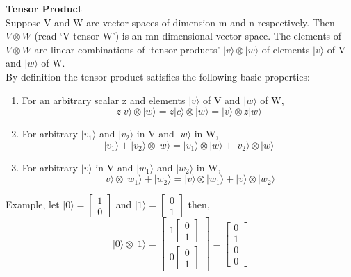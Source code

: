 \documentclass[12pt]{report}
\begin{document}
\begin{defn}
\textbf{Tensor Product}\\
Suppose V and W are vector spaces of dimension m and n respectively. Then $V \otimes W$ (read ‘V tensor W’) is an mn dimensional vector space. The elements of $V\otimes W$ are linear combinations of ‘tensor products’ $|v\rangle \otimes |w\rangle$ of elements $|v\rangle$ of V and $|w\rangle$ of W.\\
By definition the tensor product satisfies the following basic properties:
\begin{enumerate}
\item For an arbitrary scalar z and elements $|v\rangle$ of V and $|w\rangle$ of W, \begin{equation*}
z|v\rangle \otimes |w\rangle = z |c\rangle \otimes |w\rangle = |v\rangle \otimes z|w\rangle
\end{equation*}
\item For arbitrary $|v_1\rangle$ and $|v_2\rangle$ in V and $|w\rangle$ in W, \begin{equation*}
|v_1\rangle + |v_2\rangle \otimes |w\rangle =  |v_1\rangle \otimes |w\rangle  + |v_2\rangle \otimes |w\rangle
\end{equation*}
\item For arbitrary $|v\rangle$ in V and $|w_1\rangle$ and $|w_2\rangle$ in W,\begin{equation*}
|v\rangle \otimes |w_1\rangle + |w_2\rangle = |v\rangle \otimes |w_1\rangle + |v\rangle \otimes |w_2\rangle
\end{equation*}
\end{enumerate}
\end{defn}
Example, let $|0\rangle = \begin{bmatrix}1\\0\end{bmatrix}$ and $|1\rangle = \begin{bmatrix}0\\1\end{bmatrix}$ then,\\
\begin{equation*} |0\rangle \otimes |1\rangle = \begin{bmatrix}1\begin{bmatrix}0\\1\end{bmatrix}\\0\begin{bmatrix}0\\1\end{bmatrix}\end{bmatrix} = \begin{bmatrix}0\\1\\0\\0\end{bmatrix}\end{equation*}
\end{document}
